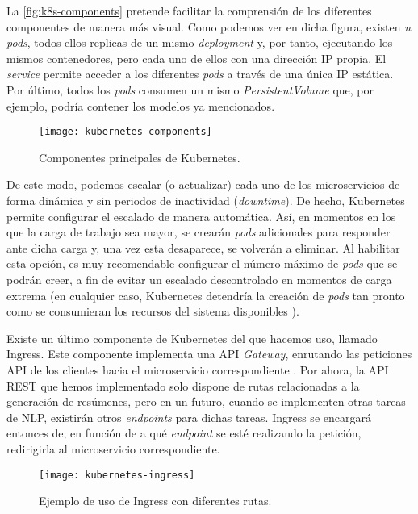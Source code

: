 La \autoref{fig:k8s-components} pretende facilitar la comprensión de los diferentes componentes de manera más visual. Como podemos ver en dicha figura, existen \emph{n} \emph{pods}, todos ellos replicas de un mismo \emph{deployment} y, por tanto, ejecutando los mismos contenedores, pero cada uno de ellos con una dirección IP propia. El \emph{service} permite acceder a los diferentes \emph{pods} a través de una única IP estática. Por último, todos los \emph{pods} consumen un mismo \emph{PersistentVolume} que, por ejemplo, podría contener los modelos ya mencionados.

\begin{figure}[!h]
	\centering
	\texttt{[image: kubernetes-components]}
	\caption{Componentes principales de Kubernetes.}
	\label{fig:k8s-components}
\end{figure}

De este modo, podemos escalar (o actualizar) cada uno de los microservicios de forma dinámica y sin periodos de inactividad (\emph{downtime}). De hecho, Kubernetes permite configurar el escalado de manera automática. Así, en momentos en los que la carga de trabajo sea mayor, se crearán \emph{pods} adicionales para responder ante dicha carga y, una vez esta desaparece, se volverán a eliminar. Al habilitar esta opción, es muy recomendable configurar el número máximo de \emph{pods} que se podrán creer, a fin de evitar un escalado descontrolado en momentos de carga extrema (en cualquier caso, Kubernetes detendría la creación de \emph{pods} tan pronto como se consumieran los recursos del sistema disponibles \cite{k8s-scheduling}).

Existe un último componente de Kubernetes del que hacemos uso, llamado Ingress. Este componente implementa una API \emph{Gateway}, enrutando las peticiones API de los clientes hacia el microservicio correspondiente \cite{api-gateway}. Por ahora, la API REST que hemos implementado solo dispone de rutas relacionadas a la generación de resúmenes, pero en un futuro, cuando se implementen otras tareas de NLP, existirán otros \emph{endpoints} para dichas tareas. Ingress se encargará entonces de, en función de a qué \emph{endpoint} se esté realizando la petición, redirigirla al microservicio correspondiente.

\begin{figure}[!h]
	\centering
	\texttt{[image: kubernetes-ingress]}
	\caption{Ejemplo de uso de Ingress con diferentes rutas.}
	\label{fig:k8s-ingress}
\end{figure}


